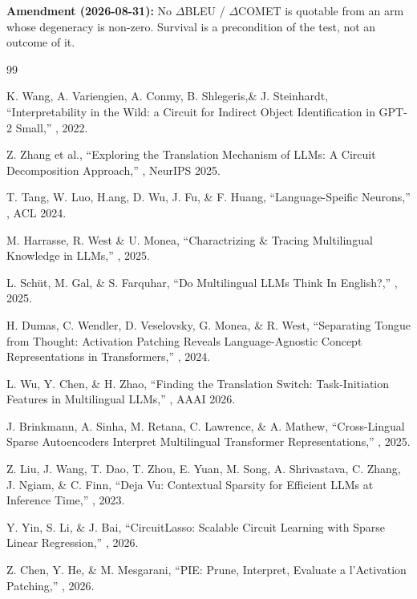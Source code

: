 \documentclass[11pt,a4paper]{article}
\begin{document}
\textbf{Amendment (2026-08-31):} No $\Delta$BLEU / $\Delta$COMET is quotable
from an arm whose degeneracy is non-zero. Survival is a precondition of the test, not an outcome of it.

\begin{thebibliography}{99}

 K. Wang, A. Variengien, A. Conmy, B. Shlegeris,\& J. Steinhardt,
  ``Interpretability in the Wild: a Circuit for Indirect Object Identification in
  GPT-2 Small,'' , 2022.

 Z. Zhang et al., ``Exploring the Translation Mechanism of
  LLMs: A Circuit Decomposition Approach,'' , NeurIPS 2025.

 T. Tang, W. Luo, H.ang, D. Wu, J. Fu,  \& F.
  Huang, ``Language-Speific Neurons,'' , ACL 2024.

 M. Harrasse, R. West \& U. Monea, ``Charactrizing & Tracing
  Multilingual Knowledge in LLMs,'' , 2025.

 L. Sch\"ut, M. Gal, \& S. Farquhar, ``Do Multilingual LLMs Think
  In English?,'' , 2025.

 H. Dumas, C. Wendler, D. Veselovsky, G. Monea, \& R. West,
  ``Separating Tongue from Thought: Activation Patching Reveals
  Language-Agnostic Concept Representations in Transformers,'' ,
  2024.

 L. Wu, Y. Chen, \& H. Zhao, ``Finding the Translation
  Switch: Task-Initiation Features in Multilingual LLMs,'' ,
  AAAI 2026.

 J. Brinkmann, A. Sinha, M. Retana, C. Lawrence, \& A.
  Mathew, ``Cross-Lingual Sparse Autoencoders Interpret Multilingual Transformer
  Representations,'' , 2025.

 Z. Liu, J. Wang, T. Dao, T. Zhou, E. Yuan, M. Song, A. Shrivastava,
  C. Zhang, J. Ngiam, \& C. Finn, ``Deja Vu: Contextual Sparsity for Efficient
  LLMs at Inference Time,'' , 2023.

 Y. Yin, S. Li, \& J. Bai, ``CircuitLasso: Scalable Circuit
  Learning with Sparse Linear Regression,'' , 2026.

 Z. Chen, Y. He, \& M. Mesgarani, ``PIE: Prune, Interpret, Evaluate
  a l'Activation Patching,'' , 2026.


\end{thebibliography}
\end{document}
